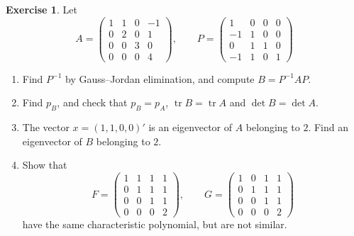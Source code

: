 \documentclass[12pt]{article}
\DeclareMathOperator{\tr}{tr}
\theoremstyle{definition}
\newtheorem{exercise}{Exercise}
\begin{document}
\begin{exercise}\label{r7-dr-similar}
Let
\[
A=\begin{pmatrix}1&1&0&-1\\0&2&0&1\\0&0&3&0\\0&0&0&4\end{pmatrix},\qquad
P=\begin{pmatrix}1&0&0&0\\-1&1&0&0\\0&1&1&0\\-1&1&0&1\end{pmatrix}
\]
\begin{enumerate}
\item Find \(P^{-1}\) by Gauss--Jordan elimination, and compute \(B=P^{-1}AP\).
\item Find \(p_B\), and check that \(p_B=p_A\), \(\tr B=\tr A\) and \(\det B=\det A\).
\item The vector \(x=(1,1,0,0)'\) is an eigenvector of \(A\) belonging to \(2\). Find an eigenvector of \(B\) belonging
to \(2\).
\item Show that
\[
F=\begin{pmatrix}1&1&1&1\\0&1&1&1\\0&0&1&1\\0&0&0&2\end{pmatrix},\qquad
G=\begin{pmatrix}1&0&1&1\\0&1&1&1\\0&0&1&1\\0&0&0&2\end{pmatrix}
\]
have the same characteristic polynomial, but are not similar.
\end{enumerate}
\end{exercise}
\end{document}
